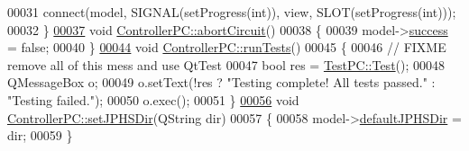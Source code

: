 \begin{DoxyCode}
00031     connect(model, SIGNAL(setProgress(\textcolor{keywordtype}{int})), view, SLOT(setProgress(\textcolor{keywordtype}{int})));
00032 \}
\hypertarget{controllerpc_8cpp_source_l00037}{}\hyperlink{class_controller_p_c_a8814989f7be1214e06b2e720889066b0}{00037} \textcolor{keywordtype}{void} \hyperlink{class_controller_p_c_a8814989f7be1214e06b2e720889066b0}{ControllerPC::abortCircuit}()
00038 \{
00039     model->\hyperlink{class_model_p_c_a945ffbbc44a832b953c191debd448f4c}{success} = \textcolor{keyword}{false};
00040 \}
\hypertarget{controllerpc_8cpp_source_l00044}{}\hyperlink{class_controller_p_c_aaa59fc90e1ef731eee4560ec87e43707}{00044} \textcolor{keywordtype}{void} \hyperlink{class_controller_p_c_aaa59fc90e1ef731eee4560ec87e43707}{ControllerPC::runTests}()
00045 \{
00046     \textcolor{comment}{// FIXME remove all of this mess and use QtTest}
00047     \textcolor{keywordtype}{bool} res = \hyperlink{class_test_p_c_adec99ddd8910d45b6aca0a105f44960e}{TestPC::Test}();
00048     QMessageBox o;
00049     o.setText(!res ? \textcolor{stringliteral}{"Testing complete! All tests passed."} : \textcolor{stringliteral}{"Testing failed."});
00050     o.exec();
00051 \}
\hypertarget{controllerpc_8cpp_source_l00056}{}\hyperlink{class_controller_p_c_ac00d29685a7e5b780c01eb438e10f96d}{00056} \textcolor{keywordtype}{void} \hyperlink{class_controller_p_c_ac00d29685a7e5b780c01eb438e10f96d}{ControllerPC::setJPHSDir}(QString dir)
00057 \{
00058     model->\hyperlink{class_model_p_c_abd038306f14f22fb885a1697c96d6335}{defaultJPHSDir} = dir;
00059 \}
\end{DoxyCode}
